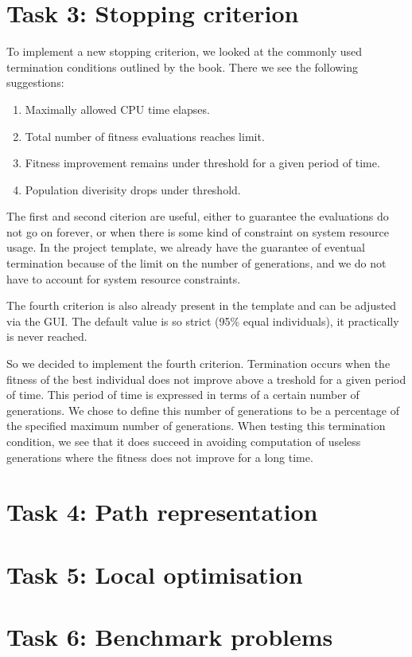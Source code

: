 \documentclass{report}
\begin{document}
\section{Task 3: Stopping criterion}
To implement a new stopping criterion, we looked at the commonly used termination conditions outlined by the book. There we see the following suggestions:
\begin{enumerate}
	\item Maximally allowed CPU time elapses.
	\item Total number of fitness evaluations reaches limit.
	\item Fitness improvement remains under threshold for a given period of time.
	\item Population diverisity drops under threshold.
\end{enumerate}
The first and second citerion are useful, either to guarantee the evaluations do not go on forever, or when there is some kind of constraint on system resource usage. In the project template, we already have the guarantee of eventual termination because of the limit on the number of generations, and we do not have to account for system resource constraints.

The fourth criterion is also already present in the template and can be adjusted via the GUI. The default value is so strict (95\% equal individuals), it practically is never reached.

So we decided to implement the fourth criterion. Termination occurs when the fitness of the best individual does not improve above a treshold for a given period of time. This period of time is expressed in terms of a certain number of generations. We chose to define this number of generations to be a percentage of the specified maximum number of generations. When testing this termination condition, we see that it does succeed in avoiding computation of useless generations where the fitness does not improve for a long time.

\newpage

\section{Task 4: Path representation}
\newpage

\section{Task 5: Local optimisation}
\newpage

\section{Task 6: Benchmark problems}
\newpage
\end{document}
